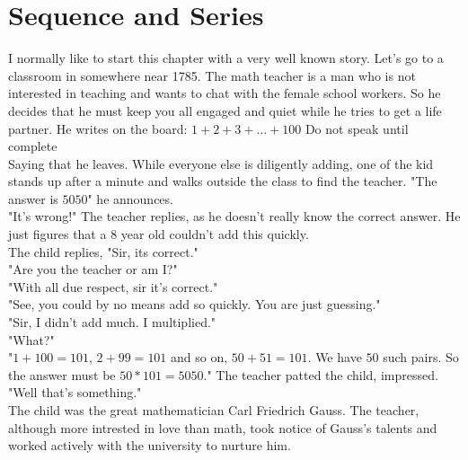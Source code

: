 \chapter{Sequence and Series}
I normally like to start this chapter with a very well known story. Let's go to a classroom in somewhere near 1785. The math teacher is a man who is not interested in teaching and wants to chat with the female school workers. So he decides that he must keep you all engaged and quiet while he tries to get a life partner. He writes on the board: $1+2+3+\dots +100$ Do not speak until complete\\
Saying that he leaves. While everyone else is diligently adding, one of the kid stands up after a minute and walks outside the class to find the teacher. "The answer is $5050$" he announces.\\
"It's wrong!" The teacher replies, as he doesn't really know the correct answer. He just figures that a 8 year old couldn't add this quickly.\\
The child replies, "Sir, its correct."\\
"Are you the teacher or am I?"\\
"With all due respect, sir it's correct."\\
"See, you could by no means add so quickly. You are just guessing."\\
"Sir, I didn't add much. I multiplied."\\
"What?"\\
"$1+100=101$, $2+99=101$ and so on, $50+51=101$. We have $50$ such pairs. So the answer must be $50*101=5050$."
The teacher patted the child, impressed. "Well that's something."\\
The child was the great mathematician Carl Friedrich Gauss. The teacher, although more intrested in love than math, took notice of Gauss's talents and worked actively with the university to nurture him.\\
